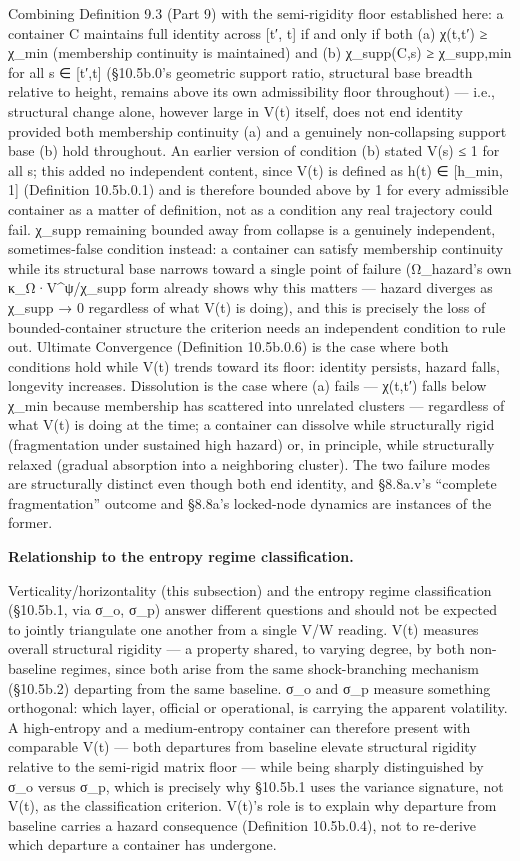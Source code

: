 \documentclass[
]{article}
\begin{document}
Combining Definition 9.3 (Part 9) with the semi-rigidity floor
established here: a container C maintains full identity across {[}t′,
t{]} if and only if both (a) χ(t,t′) ≥ χ\_min (membership continuity is
maintained) and (b) χ\_supp(C,s) ≥ χ\_supp,min for all s ∈ {[}t′,t{]}
(§10.5b.0's geometric support ratio, structural base breadth relative to
height, remains above its own admissibility floor throughout) --- i.e.,
structural change alone, however large in V(t) itself, does not end
identity provided both membership continuity (a) and a genuinely
non-collapsing support base (b) hold throughout. An earlier version of
condition (b) stated V(s) ≤ 1 for all s; this added no independent
content, since V(t) is defined as h(t) ∈ {[}h\_min, 1{]} (Definition
10.5b.0.1) and is therefore bounded above by 1 for every admissible
container as a matter of definition, not as a condition any real
trajectory could fail. χ\_supp remaining bounded away from collapse is a
genuinely independent, sometimes-false condition instead: a container
can satisfy membership continuity while its structural base narrows
toward a single point of failure (Ω\_hazard's own κ\_Ω·V\^{}ψ/χ\_supp
form already shows why this matters --- hazard diverges as χ\_supp → 0
regardless of what V(t) is doing), and this is precisely the loss of
bounded-container structure the criterion needs an independent condition
to rule out. Ultimate Convergence (Definition 10.5b.0.6) is the case
where both conditions hold while V(t) trends toward its floor: identity
persists, hazard falls, longevity increases. Dissolution is the case
where (a) fails --- χ(t,t′) falls below χ\_min because membership has
scattered into unrelated clusters --- regardless of what V(t) is doing
at the time; a container can dissolve while structurally rigid
(fragmentation under sustained high hazard) or, in principle, while
structurally relaxed (gradual absorption into a neighboring cluster).
The two failure modes are structurally distinct even though both end
identity, and §8.8a.v's ``complete fragmentation'' outcome and §8.8a's
locked-node dynamics are instances of the former.

\textbf{Relationship to the entropy regime classification.}

Verticality/horizontality (this subsection) and the entropy regime
classification (§10.5b.1, via σ\_o, σ\_p) answer different questions and
should not be expected to jointly triangulate one another from a single
V/W reading. V(t) measures overall structural rigidity --- a property
shared, to varying degree, by both non-baseline regimes, since both
arise from the same shock-branching mechanism (§10.5b.2) departing from
the same baseline. σ\_o and σ\_p measure something orthogonal: which
layer, official or operational, is carrying the apparent volatility. A
high-entropy and a medium-entropy container can therefore present with
comparable V(t) --- both departures from baseline elevate structural
rigidity relative to the semi-rigid matrix floor --- while being sharply
distinguished by σ\_o versus σ\_p, which is precisely why §10.5b.1 uses
the variance signature, not V(t), as the classification criterion.
V(t)'s role is to explain why departure from baseline carries a hazard
consequence (Definition 10.5b.0.4), not to re-derive which departure a
container has undergone.
\end{document}
